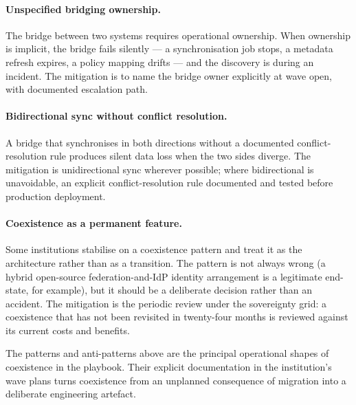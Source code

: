 \paragraph{Unspecified bridging ownership.} The bridge between two
systems requires operational ownership. When ownership is implicit,
the bridge fails silently --- a synchronisation job stops, a
metadata refresh expires, a policy mapping drifts --- and the
discovery is during an incident. The mitigation is to name the
bridge owner explicitly at wave open, with documented escalation
path.

\paragraph{Bidirectional sync without conflict resolution.} A
bridge that synchronises in both directions without a documented
conflict-resolution rule produces silent data loss when the two
sides diverge. The mitigation is unidirectional sync wherever
possible; where bidirectional is unavoidable, an explicit
conflict-resolution rule documented and tested before production
deployment.

\paragraph{Coexistence as a permanent feature.} Some institutions
stabilise on a coexistence pattern and treat it as the architecture
rather than as a transition. The pattern is not always wrong (a
hybrid open-source federation-and-IdP identity arrangement is a
legitimate end-state, for example), but it should be a deliberate
decision
rather than an accident. The mitigation is the periodic review
under the sovereignty grid: a coexistence that has not been
revisited in twenty-four months is reviewed against its current
costs and benefits.

\medskip

\noindent The patterns and anti-patterns above are the principal
operational shapes of coexistence in the playbook. Their explicit
documentation in the institution's wave plans turns coexistence
from an unplanned consequence of migration into a deliberate
engineering artefact.
